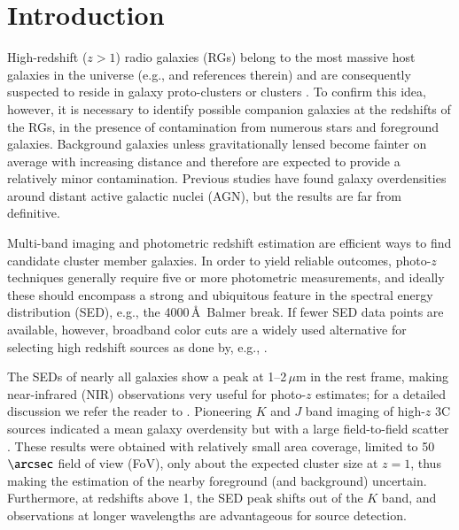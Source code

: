 \documentclass[mathleft,fleqn,%
]{an}
\begin{document}
\section{Introduction} \label{sec:intro}


High-redshift ($z>1$) radio galaxies (RGs) belong to the most massive host
galaxies in the universe %
(e.g., \citet{Seymour07} and references therein)
and are 
consequently suspected to reside in galaxy proto-clusters or
clusters \citep{Miley08}. 
To confirm this idea, however, it is necessary to 
identify possible companion galaxies at
the redshifts of the RGs, in the presence of contamination 
from numerous stars 
and foreground galaxies. 
Background galaxies unless gravitationally lensed become 
fainter on average with increasing distance
and therefore are expected to provide a relatively minor contamination. 
Previous studies have found galaxy overdensities around distant active
galactic nuclei (AGN), but
the results are far from definitive. 

Multi-band imaging and photometric redshift estimation
are efficient ways to find candidate cluster member
galaxies.
In order to yield reliable outcomes, photo-$z$ techniques generally 
require five or more photometric measurements, and ideally these
should encompass  
a strong and ubiquitous
feature in the spectral energy distribution (SED), e.g., the
4000\,\AA\ Balmer break. 
If fewer SED data points are available, however, broadband color cuts are a widely used 
alternative for selecting high redshift sources as done by, e.g., \citet{Huang04}.

The SEDs of nearly all galaxies show a peak at 1--2\,$\mu$m in the rest frame,
making near-infrared (NIR) observations very useful for photo-$z$
estimates; for a detailed discussion we refer the reader to \citet{Galametz12}. 
Pioneering $K$ and $J$ band imaging of high-$z$ 3C sources indicated
a mean galaxy 
overdensity but with a large field-to-field scatter \citep{Best00, Best03}. These 
results were obtained with relatively small area coverage, limited to 50$\arcsec$ field of view (FoV), 
only about the expected cluster size at $z=1$, thus making the estimation 
of the nearby foreground (and background) uncertain.
Furthermore, at redshifts above 1, the SED peak shifts out of the $K$ band,  
and observations at longer wavelengths are advantageous for source detection. 
\end{document}
